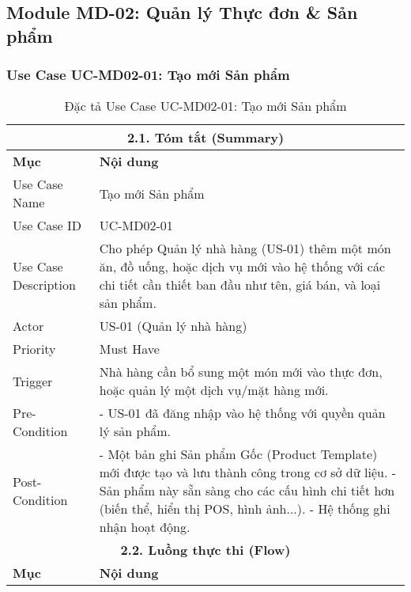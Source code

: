 \subsection{Module MD-02: Quản lý Thực đơn \& Sản phẩm}

\subsubsection{Use Case UC-MD02-01: Tạo mới Sản phẩm}

\begin{longtable}{|m{4cm}|p{11cm}|}
\caption{Đặc tả Use Case UC-MD02-01: Tạo mới Sản phẩm} \label{tab:uc_md02_01_revised} \\
\hline
\multicolumn{2}{|c|}{\textbf{2.1. Tóm tắt (Summary)}} \\
\hline
\textbf{Mục} & \textbf{Nội dung} \\
\hline
\endhead %
\hline
\endfoot %
\hline
\endlastfoot %
Use Case Name & Tạo mới Sản phẩm \\
\hline
Use Case ID & UC-MD02-01 \\
\hline
Use Case Description & Cho phép Quản lý nhà hàng (US-01) thêm một món ăn, đồ uống, hoặc dịch vụ mới vào hệ thống với các chi tiết cần thiết ban đầu như tên, giá bán, và loại sản phẩm. \\
\hline
Actor & US-01 (Quản lý nhà hàng) \\
\hline
Priority & Must Have \\
\hline
Trigger & Nhà hàng cần bổ sung một món mới vào thực đơn, hoặc quản lý một dịch vụ/mặt hàng mới. \\
\hline
Pre-Condition & - US-01 đã đăng nhập vào hệ thống với quyền quản lý sản phẩm. \\
\hline
Post-Condition & - Một bản ghi Sản phẩm Gốc (Product Template) mới được tạo và lưu thành công trong cơ sở dữ liệu. \newline - Sản phẩm này sẵn sàng cho các cấu hình chi tiết hơn (biến thể, hiển thị POS, hình ảnh...). \newline - Hệ thống ghi nhận hoạt động. \\
\hline
\multicolumn{2}{|c|}{\textbf{2.2. Luồng thực thi (Flow)}} \\
\hline
\textbf{Mục} & \textbf{Nội dung} \\
\hline

\end{longtable}
